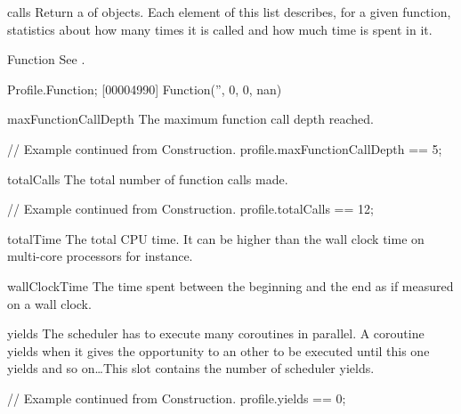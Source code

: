 \begin{urbiscriptapi}
\item[calls]%
  Return a  of  objects. Each
  element of this list describes, for a given function, statistics about how
  many times it is called and how much time is spent in it.


\item[Function]
  See .
\begin{urbiscript}
Profile.Function;
[00004990] Function('', 0, 0, nan)
\end{urbiscript}


\item[maxFunctionCallDepth]%
  The maximum function call depth reached.
\begin{urbiassert}
// Example continued from Construction.
profile.maxFunctionCallDepth == 5;
\end{urbiassert}


\item[totalCalls]%
  The total number of function calls made.
\begin{urbiassert}
// Example continued from Construction.
profile.totalCalls == 12;
\end{urbiassert}


\item[totalTime]%
  The total CPU time. It can be higher than the wall clock time on
  multi-core processors for instance.


\item[wallClockTime]%
  The time spent between the beginning and the end as if measured on a wall
  clock.


\item[yields]%
  The scheduler has to execute many coroutines in parallel. A coroutine
  yields when it gives the opportunity to an other to be executed until this
  one yields and so on\dots This slot contains the number of scheduler
  yields.
\begin{urbiassert}
// Example continued from Construction.
profile.yields == 0;
\end{urbiassert}
\end{urbiscriptapi}


